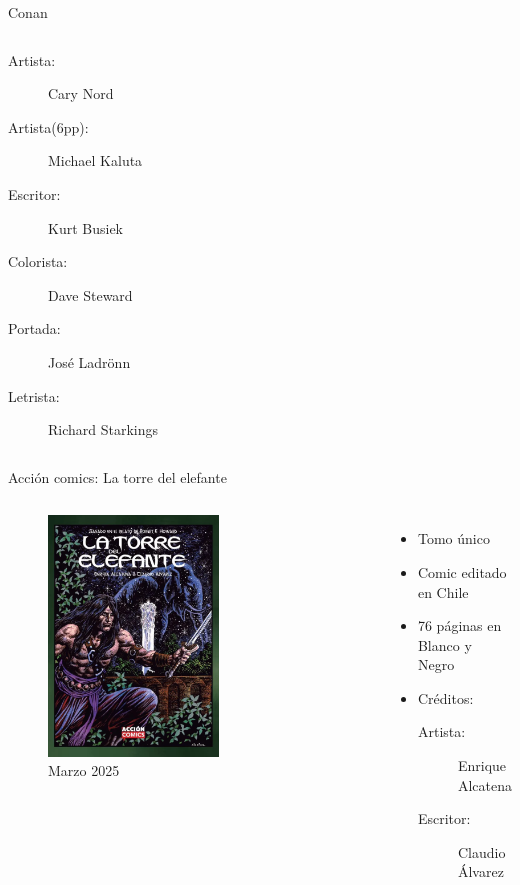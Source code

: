\begin{frame}{Conan}
\begin{columns}
\begin{itemize}
         \begin{description}
            \item[Artista:] Cary Nord
            \item[Artista(6pp):] Michael Kaluta
            \item[Escritor:] Kurt Busiek
            \item[Colorista:] Dave Steward
            \item[Portada:] José Ladrönn
            \item[Letrista:] Richard Starkings
         \end{description}
    \end{itemize}
\end{columns}
\end{frame}

\begin{frame}{Acción comics: La torre del elefante}
	\begin{columns}
		\begin{figure}[htb]
			\centering
			\includegraphics[width=0.6\textwidth]{img/AlcatenaTorre}
			\caption{Marzo 2025}
		\end{figure}
		\begin{itemize}
			\item Tomo único
			\item Comic editado en Chile
			\item 76 páginas en Blanco y Negro
			\item Créditos:
			\begin{description}
				\item[Artista:] Enrique Alcatena
				\item[Escritor:] Claudio Álvarez
			\end{description}
		\end{itemize}
	\end{columns}
\end{frame}


